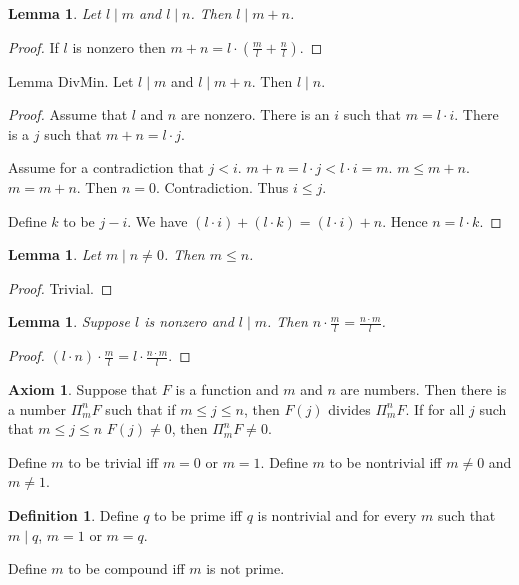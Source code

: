 \documentclass[a4paper,10pt]{article}
\theoremstyle{plain}
\newtheorem{lemma}[theorem]{Lemma}
\theoremstyle{definition}
\newtheorem{definition}[theorem]{Definition}
\newtheorem{axiom}[theorem]{Axiom}
\begin{document}
\begin{lemma} 
Let $l \mid m$ and $l \mid n$. Then $l \mid m + n$.
\end{lemma}
\begin{proof}
If $l$ is nonzero then $m + n = l \cdot (\frac{m}{l} + \frac{n}{l})$.
\end{proof}

Lemma DivMin. Let $l \mid m$ and $l \mid m + n$. Then $l \mid n$.
\begin{proof}
Assume that $l$ and $n$ are nonzero.
There is an $i$ such that $m = l \cdot i$. 
There is a $j$ such that $m + n = l \cdot j$.

Assume for a contradiction that $j < i$.
$m+n = l \cdot j < l \cdot i = m$. 
$m \leq m+n$.
$m = m+n$. Then $n=0$.
Contradiction. Thus $i \leq j$.
 
Define $k$ to be $j - i$.
We have $(l \cdot i) + (l \cdot k) = (l \cdot i) + n$.
Hence $n = l \cdot k$.
\end{proof}

\begin{lemma} 
Let $m \mid n \neq 0$. Then $m \leq n$.
\end{lemma}
\begin{proof}
Trivial.
\end{proof}

\begin{lemma} 
Suppose $l$ is nonzero and $l \mid m$.
Then $n \cdot \frac{m}{l} = \frac{n \cdot m}{l}$.
\end{lemma}
\begin{proof}
$(l \cdot n) \cdot \frac{m}{l} = l \cdot \frac{n \cdot m}{l}$.
\end{proof}

\begin{axiom}
Suppose that $F$ is a function and $m$ and $n$ are numbers. Then there is a number $\Pi_m^n F$ such that if $m \leq j \leq n$, then $F(j)$ divides $\Pi_m^n F$. If for all $j$ such that $m \leq j \leq n$ $F(j) \neq 0$, then $\Pi_m^n F \neq 0$.
\end{axiom}

Define $m$ to be trivial iff $m = 0$ or $m = 1$.
Define $m$ to be nontrivial iff $m \neq 0$ and $m \neq 1$.

\begin{definition} 
Define $q$ to be prime iff $q$ is nontrivial and
for every $m$ such that $m \mid q$, $m = 1$ or $m = q$.
\end{definition}

Define $m$ to be compound iff $m$ is not prime.
\end{document}
